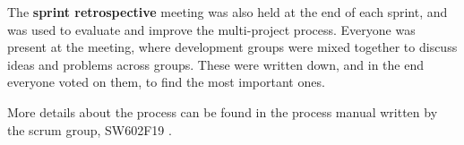 The \textbf{sprint retrospective} meeting was also held at the end of each sprint, and was used to evaluate and improve the multi-project process. Everyone was present at the meeting, where development groups were mixed together to discuss ideas and problems across groups. These were written down, and in the end everyone voted on them, to find the most important ones.


More details about the process can be found in the process manual written by the scrum group, SW602F19 \citep{cite:projectManualSW602F19}.
